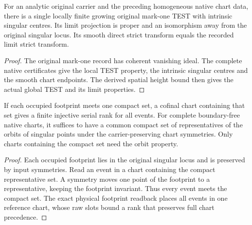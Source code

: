 \begin{corollary}
\label{hir:g8-native-homogeneous-endpoint}
\leanok
For an analytic original carrier and the preceding homogeneous
native chart data, there is a single locally finite growing
original mark-one TEST with intrinsic singular centres. Its
limit projection is proper and an isomorphism away from the
original singular locus. Its smooth direct strict transform
equals the recorded limit strict transform.
\end{corollary}
\begin{proof}
The original mark-one record has coherent vanishing ideal.
The complete native certificates give the local TEST property,
the intrinsic singular centres and the smooth chart endpoints.
The derived spatial height bound then gives the actual global
TEST and its limit properties.
\end{proof}

\begin{theorem}
\label{hir:g8-native-compact-orbit-rank}
\leanok
If each occupied footprint meets one compact set, a cofinal chart
containing that set gives a finite injective serial rank for all
events. For complete boundary-free native charts, it suffices to
have a common compact set of representatives of the orbits of
singular points under the carrier-preserving chart symmetries.
Only charts containing the compact set need the orbit property.
\end{theorem}
\begin{proof}
Each occupied footprint lies in the original singular locus and
is preserved by input symmetries. Read an event in a chart
containing the compact representative set. A symmetry moves one
point of the footprint to a representative, keeping the footprint
invariant. Thus every event meets the compact set. The exact
physical footprint readback places all events in one reference
chart, whose raw slots bound a rank that preserves full chart
precedence.
\end{proof}

